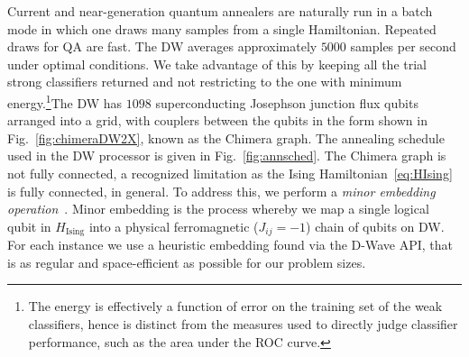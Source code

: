 Current and near-generation quantum annealers are naturally run in a batch mode in which one draws many samples from a single Hamiltonian. Repeated draws for QA are  fast. The DW averages approximately $5000$ samples per second under optimal conditions. We take advantage of this by keeping all the trial strong classifiers returned and not restricting to the one with minimum energy.\footnote{The energy is effectively a function of error on the training set of the weak classifiers, hence is distinct from the measures used to directly judge classifier performance, such as the area under the ROC curve.}The DW has $1098$ superconducting Josephson junction flux qubits arranged into a grid, with couplers between the qubits in the form shown in Fig.~\ref{fig:chimeraDW2X}, known as the Chimera graph. The annealing schedule used in the DW processor is given in Fig.~\ref{fig:annsched}. The  Chimera graph is not fully connected, a recognized  limitation  as the Ising Hamiltonian~\eqref{eq:HIsing} is fully connected, in general. To address this, we perform a {\it minor embedding operation}~\cite{Choi1,Choi2}. Minor embedding is the process whereby we map a single logical qubit in $H_{\mathrm{Ising}}$ into a physical ferromagnetic ($J_{ij}=-1$) chain of qubits on DW.
For each instance we use a heuristic embedding found via the D-Wave API, that is as regular and space-efficient as possible for our problem sizes.

